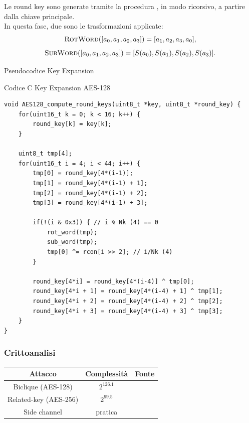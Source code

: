 \documentclass[target=bach,aauheader=,style=]{thud}
\begin{document}
			Le round key sono generate tramite la procedura , in modo ricorsivo, a partire dalla chiave principale.\\
			In questa fase, due sono le trasformazioni applicate:
			\[\Call{RotWord}{[a_0,a_1,a_2,a_3]} = [a_1,a_2,a_3,a_0],\]
			\[\Call{SubWord}{[a_0,a_1,a_2,a_3]} = [S(a_0),S(a_1), S(a_2), S(a_3)].\]
			\begin{algorithm}
				\caption{Pseudocodice Key Expansion}
				\begin{algorithmic}
						\EndWhile
							\EndIf
						\EndWhile
					\EndProcedure
				\end{algorithmic}
			\end{algorithm}
			\begin{algorithm}
				\caption{Codice C Key Expansion AES-128}
\begin{lstlisting}[style=CStyle]
void AES128_compute_round_keys(uint8_t *key, uint8_t *round_key) {
	for(uint16_t k = 0; k < 16; k++) {
		round_key[k] = key[k];
	}
	
	uint8_t tmp[4];
	for(uint16_t i = 4; i < 44; i++) {
		tmp[0] = round_key[4*(i-1)];
		tmp[1] = round_key[4*(i-1) + 1];
		tmp[2] = round_key[4*(i-1) + 2];
		tmp[3] = round_key[4*(i-1) + 3];
		
		if(!(i & 0x3)) { // i % Nk (4) == 0
			rot_word(tmp);
			sub_word(tmp);
			tmp[0] ^= rcon[i >> 2]; // i/Nk (4)
		}
		
		round_key[4*i] = round_key[4*(i-4)] ^ tmp[0];
		round_key[4*i + 1] = round_key[4*(i-4) + 1] ^ tmp[1];
		round_key[4*i + 2] = round_key[4*(i-4) + 2] ^ tmp[2];
		round_key[4*i + 3] = round_key[4*(i-4) + 3] ^ tmp[3];
	}
}\end{lstlisting}
			\end{algorithm}
			\subsubsection{Crittoanalisi}
			\begin{center}
				\begin{tabular}{ |c|c|c| } 
					\hline
					Attacco & Complessità & Fonte \\ 
					\hline
					\hline
					Biclique (AES-128) & $2^{126.1}$ & \cite{aes_biclique} \\ 
					\hline
					Related-key (AES-256) & $2^{99.5}$ & \cite{aes_relatedkey} \\ 
					\hline
					Side channel & pratica & \cite{aesside, aesfault}\\
					\hline
				\end{tabular}
			\end{center}
\end{document}

